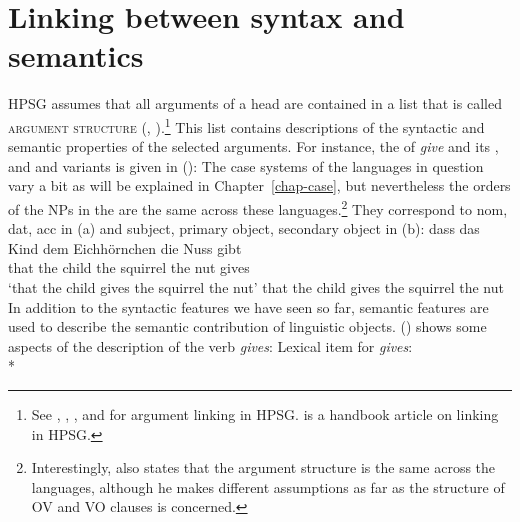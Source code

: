 \section{Linking between syntax and semantics}
\label{sec-linking}


HPSG assumes that all arguments of a head are contained in a list that is called \textsc{argument
  structure} (\argst, \citealp*{DKW2021a}).\footnote{%
See , ,
, and  for argument
linking in HPSG.  is a handbook article on linking in HPSG.
} This list contains descriptions of the syntactic and semantic properties of
the selected arguments. For instance, the \argstl of  \emph{give} and its ,  and
 and  variants is given in ():
\ea
{}
\z
The case systems of the languages in question vary a bit as will be explained in
Chapter~\ref{chap-case}, but nevertheless the orders of the NPs in the \argstl are the same across these
languages.\footnote{%
  Interestingly, \citet[]{Haider2010a} also states that the argument structure is the same
  across the  languages, although he makes different assumptions as far as the structure of
  OV and VO clauses is concerned.%
} They correspond to nom, dat, acc in  (a) and subject, primary object, secondary object
in  (b):
\eal
\ex 
\gll dass das Kind dem Eichhörnchen die Nuss gibt\\
    that the child  the squirrel    the nut gives\\
\glt `that the child gives the squirrel the nut'
\ex that the child gives the squirrel the nut
\zl
\largerpage
In addition to the syntactic features we have seen so far, semantic features are used to describe the
semantic contribution of linguistic objects. () shows some aspects of the description of the  verb
\emph{gives}:
\ea
Lexical item for \emph{gives}:\\*

